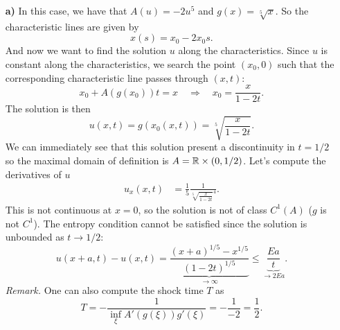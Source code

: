 \begin{enumerate}
    \item[\textbf{a)}]
          In this case, we have that \(A(u) = -2u^5\) and \(g(x) = \sqrt[5]{x}\). So the characteristic lines are given by
          \[
              x(s) = x_0 - 2 x_0 s.
          \]
          And now we want to find the solution \(u\) along the characteristics. Since
          \(u\) is constant along the characteristics, we search the point \((x_0, 0)\)
          such that the corresponding characteristic line passes through \((x, t)\):
          \[
              x_0 + A(g(x_0)) t = x \quad \Rightarrow \quad x_0 = \frac{x}{1-2t}.
          \]
          The solution is then
          \[
              u(x,t) = g(x_0(x,t)) = \sqrt[5]{\frac{x}{1-2t}}.
          \]
          We can immediately see that this solution present a discontinuity in \(t=1/2\)
          so the maximal domain of definition is \(A = \mathbb{R} \times (0, 1/2)\). Let's
          compute the derivatives of \(u\)
          \begin{align*}
              u_x(x,t) & = \frac{1}{5} \frac{1}{\sqrt[5]{\frac{x}{1-2t}}^4}.
          \end{align*}
          This is not continuous at \(x=0\), so the solution is not of class \(C^1(A)\) ($g$ is not $C^1$).
          The entropy condition cannot be satisfied since the solution is unbounded as \(t \to 1/2\):
          \[
              u(x+a,t) - u(x,t) = \underbrace{\frac{(x+a)^{1/5}-x^{1/5}}{(1-2t)^{1/5}}}_{\rightarrow \infty}
              \leq \underbrace{\frac{Ea}{t}}_{\rightarrow 2Ea}.
          \]
          \textit{Remark.} One can also compute the shock time \(T\) as
          \[
              T = - \frac{1}{\inf_\xi A'(g(\xi))g'(\xi)} = -\frac{1}{-2} = \frac{1}{2}.
          \]


\end{enumerate}
